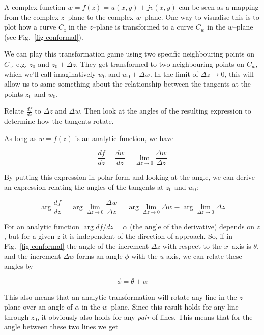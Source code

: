 A complex function $w = f(z) = u(x,y)+jv(x,y)$ can be seen as a mapping from the complex $z$--plane to the complex $w$--plane. One way to visualise this is to plot how a curve $C_z$ in the $z$--plane is transformed to a curve $C_w$ in the $w$--plane (see Fig.~\ref{fig-conformal}).

We can play this transformation game using two specific neighbouring points on $C_z$, e.g. $z_0$ and $z_0+\Delta z$. They get transformed to two neighbouring points on $C_w$, which we'll call imaginatively $w_0$ and $w_0+\Delta w$. In the limit of $\Delta z \to 0$, this will allow us to same something about the relationship between the tangents at the points $z_0$ and $w_0$.

\begin{cue}
Relate $\frac{df}{dz}$ to $\Delta z$ and $\Delta w$. Then look at the angles of the resulting expression to determine how the tangents rotate.
\end{cue}

As long as $w=f(z)$ is an analytic function, we have

\begin{equation}
\frac{df}{dz} = \frac{dw}{dz} = \lim_{\Delta z \to 0} \frac{\Delta w}{\Delta z}
\end{equation}

By putting this expression in polar form and looking at the angle, we can derive an expression relating the angles of the tangents at $z_0$ and $w_0$:

\begin{equation}
\arg \frac{df}{dz} = \arg \lim_{\Delta z \to 0} \frac{\Delta w}{\Delta z} = \arg
\lim_{\Delta z   \to 0} \Delta w - \arg \lim_{\Delta z \to 0} \Delta z
\end{equation} 

For an analytic function $\arg df / dz = \alpha$ (the angle of the derivative) depends on $z$, but for a given $z$ it is independent of the direction of approach. So, if in Fig.~\ref{fig-conformal} the angle of the increment $\Delta z$ with respect to the $x$--axis is $\theta$, and the increment $\Delta w$ forms an angle $\phi$ with the $u$ axis, we can relate these angles by

\begin{equation}
\phi = \theta + \alpha
\end{equation}

This also means that an analytic transformation will rotate any line in the $z$--plane over an angle of $\alpha$ in the $w$--plane. Since this result holds for any line through $z_0$, it obviously also holds for any \emph{pair} of lines. This means that for the angle between these two lines we get

